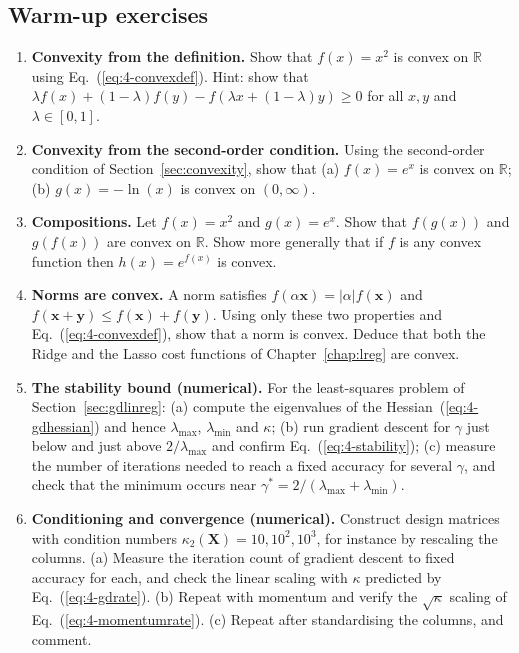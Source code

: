 \subsection*{Warm-up exercises}

\begin{enumerate}

\item \textbf{Convexity from the definition.}
  Show that $f(x)=x^{2}$ is convex on $\mathbb{R}$ using
  Eq.~(\ref{eq:4-convexdef}).  Hint: show that
  $\lambda f(x)+(1-\lambda)f(y)-f(\lambda x+(1-\lambda)y)\ge0$ for all
  $x,y$ and $\lambda\in[0,1]$.

\item \textbf{Convexity from the second-order condition.}
  Using the second-order condition of Section~\ref{sec:convexity}, show that
  (a) $f(x)=e^{x}$ is convex on $\mathbb{R}$;
  (b) $g(x)=-\ln(x)$ is convex on $(0,\infty)$.

\item \textbf{Compositions.}
  Let $f(x)=x^{2}$ and $g(x)=e^{x}$.  Show that $f(g(x))$ and $g(f(x))$ are
  convex on $\mathbb{R}$.  Show more generally that if $f$ is any convex
  function then $h(x)=e^{f(x)}$ is convex.

\item \textbf{Norms are convex.}
  A norm satisfies $f(\alpha\bm{x})=|\alpha|f(\bm{x})$ and
  $f(\bm{x}+\bm{y})\le f(\bm{x})+f(\bm{y})$.  Using only these two properties
  and Eq.~(\ref{eq:4-convexdef}), show that a norm is convex.  Deduce that
  both the Ridge and the Lasso cost functions of Chapter~\ref{chap:lreg} are
  convex.

\item \textbf{The stability bound (numerical).}
  For the least-squares problem of Section~\ref{sec:gdlinreg}:
  (a) compute the eigenvalues of the Hessian~(\ref{eq:4-gdhessian}) and hence
      $\lambda_{\max}$, $\lambda_{\min}$ and $\kappa$;
  (b) run gradient descent for $\gamma$ just below and just above
      $2/\lambda_{\max}$ and confirm Eq.~(\ref{eq:4-stability});
  (c) measure the number of iterations needed to reach a fixed accuracy for
      several $\gamma$, and check that the minimum occurs near
      $\gamma^{*}=2/(\lambda_{\max}+\lambda_{\min})$.

\item \textbf{Conditioning and convergence (numerical).}
  Construct design matrices with condition numbers
  $\kappa_2(\bm{X})=10,10^{2},10^{3}$, for instance by rescaling the columns.
  (a) Measure the iteration count of gradient descent to fixed accuracy for
      each, and check the linear scaling with $\kappa$ predicted by
      Eq.~(\ref{eq:4-gdrate}).
  (b) Repeat with momentum and verify the $\sqrt{\kappa}$ scaling of
      Eq.~(\ref{eq:4-momentumrate}).
  (c) Repeat after standardising the columns, and comment.


\end{enumerate}
